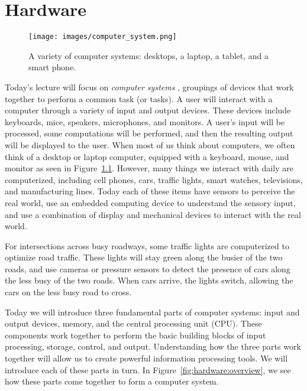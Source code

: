 \chapter{Hardware}

\begin{figure}
	\centering
	\texttt{[image: images/computer\_system.png]}
	\caption{A variety of computer systems: desktops, a laptop, a tablet, and a
    smart phone. }
	\label{fig:hardware:computers}
\end{figure}

Today's lecture will focus on \emph{computer systems} , groupings of devices that work together to perform a common
task (or tasks). A user will interact with a computer through a variety of input
and output devices. These devices include keyboards, mice, speakers, microphones, and monitors. A
user's input will be processed, some computations will be performed, and then
the resulting output will be displayed to the user. When most of us think about
computers, we often think of a desktop or laptop computer, equipped with a
keyboard, mouse, and monitor as seen in Figure~\ref{fig:hardware:computers}.
However, many things we interact with daily are computerized, including cell
phones, cars, traffic lights, smart watches, televisions, and manufacturing
lines. Today each of these items have sensors to perceive the real world, use an
embedded computing device to understand the sensory input, and use a combination
of display and mechanical devices to interact with the real world.

\begin{example}
  For intersections across busy roadways, some traffic lights are computerized
  to optimize road traffic. These lights will stay green along the busier of the
  two roads, and use cameras or pressure sensors to detect the presence of cars
  along the less busy of the two roads. When cars arrive, the lights switch,
  allowing the cars on the less busy road to cross.
\end{example}

Today we will introduce three fundamental parts of computer systems:
input and output devices, memory, and the central processing unit (CPU).
These components work together to perform the basic building blocks of
input processing, storage, control, and output. Understanding how the
three parts work together will allow us to create powerful information
processing tools. We will introduce each of these parts in turn.
In Figure~\ref{fig:hardware:overview}, we see how these parts come
together to form a computer system.


